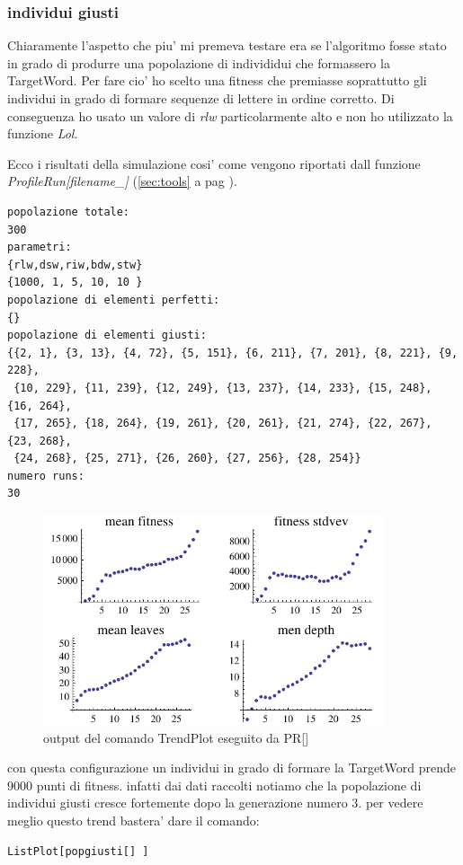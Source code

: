 \documentclass[12pt, a4paper]{article}
\begin{document}
\subsubsection{individui giusti}
Chiaramente l'aspetto che piu' mi premeva testare era se l'algoritmo fosse stato in grado di produrre una popolazione di individidui che formassero la TargetWord.
Per fare cio' ho scelto una fitness che premiasse soprattutto gli individui in grado di formare sequenze di lettere in ordine corretto.
Di conseguenza ho usato un valore di {\itshape rlw} particolarmente alto e non ho utilizzato la funzione {\itshape Lol}.

Ecco i risultati della simulazione cosi' come vengono riportati dall funzione {\itshape ProfileRun[filename\_]} (\ref{sec:tools} a pag \pageref{sec:tools}).
\begin{lstlisting}
popolazione totale:
300
parametri:
{rlw,dsw,riw,bdw,stw}
{1000, 1, 5, 10, 10 }
popolazione di elementi perfetti: 
{}
popolazione di elementi giusti: 
{{2, 1}, {3, 13}, {4, 72}, {5, 151}, {6, 211}, {7, 201}, {8, 221}, {9, 228}, 
 {10, 229}, {11, 239}, {12, 249}, {13, 237}, {14, 233}, {15, 248}, {16, 264}, 
 {17, 265}, {18, 264}, {19, 261}, {20, 261}, {21, 274}, {22, 267}, {23, 268}, 
 {24, 268}, {25, 271}, {26, 260}, {27, 256}, {28, 254}}
numero runs:
30
\end{lstlisting}


\begin{figure}[!h]
\begin{center}
\includegraphics[width=10.0cm]{pr_expr1_run1.pdf}
\caption{output del comando TrendPlot eseguito da PR[]} 
\label{figure:prexpr1}
\end{center}
\end{figure}


con questa configurazione un individui in grado di formare la TargetWord prende 9000 punti di fitness.
infatti dai dati raccolti notiamo che la popolazione di individui giusti cresce fortemente dopo la generazione numero 3.
per vedere meglio questo trend bastera' dare il comando:
\begin{lstlisting}
ListPlot[popgiusti[] ]
\end{lstlisting}
\end{document}
